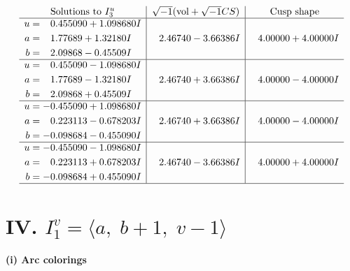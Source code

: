 \documentclass[1p]{elsarticle_modified}
\theoremstyle{definition}
\newcommand{\I}{\sqrt{-1}}
\begin{document}
$$\begin{array}{c|c|c}  
\text{Solutions to }I^u_{3}& \I (\text{vol} + \sqrt{-1}CS) & \text{Cusp shape}\\
 \hline 
\begin{aligned}
u &= \phantom{-}0.455090 + 1.098680 I \\
a &= \phantom{-}1.77689 + 1.32180 I \\
b &= \phantom{-}2.09868 - 0.45509 I\end{aligned}
 & \phantom{-}2.46740 - 3.66386 I & \phantom{-}4.00000 + 4.00000 I \\ \hline\begin{aligned}
u &= \phantom{-}0.455090 - 1.098680 I \\
a &= \phantom{-}1.77689 - 1.32180 I \\
b &= \phantom{-}2.09868 + 0.45509 I\end{aligned}
 & \phantom{-}2.46740 + 3.66386 I & \phantom{-}4.00000 - 4.00000 I \\ \hline\begin{aligned}
u &= -0.455090 + 1.098680 I \\
a &= \phantom{-}0.223113 - 0.678203 I \\
b &= -0.098684 - 0.455090 I\end{aligned}
 & \phantom{-}2.46740 + 3.66386 I & \phantom{-}4.00000 - 4.00000 I \\ \hline\begin{aligned}
u &= -0.455090 - 1.098680 I \\
a &= \phantom{-}0.223113 + 0.678203 I \\
b &= -0.098684 + 0.455090 I\end{aligned}
 & \phantom{-}2.46740 - 3.66386 I & \phantom{-}4.00000 + 4.00000 I\\
 \hline 
 \end{array}$$\newpage\newpage\renewcommand{\arraystretch}{1}
\centering \section*{IV. $I^v_{1}= \langle a,\;b+1,\;v-1 \rangle$}
\flushleft \textbf{(i) Arc colorings}\\
\end{document}
